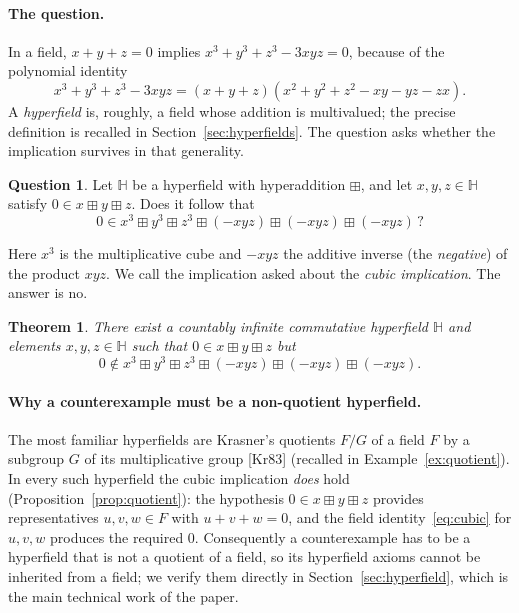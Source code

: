 \documentclass[11pt]{article}
\theoremstyle{plain}
\newtheorem{theorem}{Theorem}[section]
\theoremstyle{definition}
\newtheorem*{question}{Question}
\newcommand{\Hh}{\mathbb{H}}
\newcommand{\bp}{\boxplus}
\begin{document}
\paragraph{The question.}
In a field, $x+y+z=0$ implies $x^3+y^3+z^3-3xyz=0$, because of the
polynomial identity
\begin{equation}\label{eq:cubic}
 x^3+y^3+z^3-3xyz=(x+y+z)(x^2+y^2+z^2-xy-yz-zx).
\end{equation}
A \emph{hyperfield} is, roughly, a field whose addition is multivalued;
the precise definition is recalled in Section~\ref{sec:hyperfields}.
The question asks whether the implication survives in that generality.

\begin{question}
Let $\Hh$ be a hyperfield with hyperaddition $\bp$, and let
$x,y,z\in\Hh$ satisfy $0\in x\bp y\bp z$.  Does it follow that
\[
 0\in x^3\bp y^3\bp z^3\bp(-xyz)\bp(-xyz)\bp(-xyz)\,?
\]
\end{question}

\noindent
Here $x^3$ is the multiplicative cube and $-xyz$ the additive inverse
(the \emph{negative}) of the product $xyz$.  We call the implication
asked about the \emph{cubic implication}.  The answer is no.

\begin{theorem}\label{thm:main}
There exist a countably infinite commutative hyperfield $\Hh$ and
elements $x,y,z\in\Hh$ such that $0\in x\bp y\bp z$ but
\[
 0\notin x^3\bp y^3\bp z^3\bp(-xyz)\bp(-xyz)\bp(-xyz).
\]
\end{theorem}

\paragraph{Why a counterexample must be a non-quotient hyperfield.}
The most familiar hyperfields are Krasner's quotients $F/G$ of a field
$F$ by a subgroup $G$ of its multiplicative group
[Kr83] (recalled in Example~\ref{ex:quotient}).  In every such hyperfield the cubic
implication \emph{does} hold (Proposition~\ref{prop:quotient}): the
hypothesis $0\in x\bp y\bp z$ provides representatives $u,v,w\in F$
with $u+v+w=0$, and the field identity~\eqref{eq:cubic} for $u,v,w$
produces the required $0$.  Consequently a counterexample has to be a
hyperfield that is not a quotient of a field, so its hyperfield axioms
cannot be inherited from a field; we verify them directly in
Section~\ref{sec:hyperfield}, which is the main technical work of the
paper.
\end{document}
